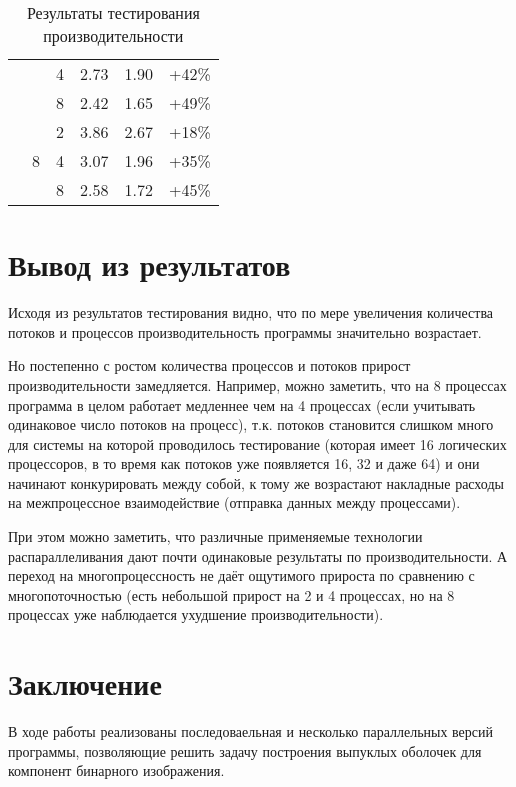 \documentclass[12pt]{article}
\begin{document}
\begin{table}[H]
\begin{tabular}{|c|c|c|c|c|c|}
                            &                     & 4                & 2.73                  & 1.90               & +42\% \\
                            &                     & 8                & 2.42                  & 1.65               & +49\% \\
\cline{2-6}
                            & \multirow{3}{*}{8}  & 2                & 3.86                  & 2.67               & +18\% \\
                            &                     & 4                & 3.07                  & 1.96               & +35\% \\
                            &                     & 8                & 2.58                  & 1.72               & +45\% \\
\hline
\end{tabular}
\caption{Результаты тестирования производительности}
\end{table}

\newpage

\section{Вывод из результатов}
Исходя из результатов тестирования видно, что по мере увеличения количества потоков и процессов производительность программы значительно возрастает.

Но постепенно с ростом количества процессов и потоков прирост производительности замедляется. Например, можно заметить, что на 8 процессах программа в целом работает медленнее чем на 4 процессах (если учитывать одинаковое число потоков на процесс), т.к. потоков становится слишком много для системы на которой проводилось тестирование (которая имеет 16 логических процессоров, в то время как потоков уже появляется 16, 32 и даже 64) и они начинают конкурировать между собой, к тому же возрастают накладные расходы на межпроцессное взаимодействие (отправка данных между процессами).

При этом можно заметить, что различные применяемые технологии распараллеливания дают почти одинаковые результаты по производительности. А переход на многопроцессность не даёт ощутимого прироста по сравнению с многопоточностью (есть небольшой прирост на 2 и 4 процессах, но на 8 процессах уже наблюдается ухудшение производительности).

\newpage

\section{Заключение}
В ходе работы реализованы последоваельная и несколько параллельных версий программы, позволяющие решить задачу построения выпуклых оболочек для компонент бинарного изображения.
\end{document}
